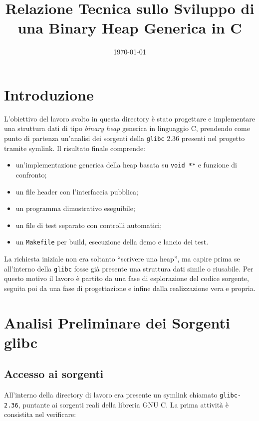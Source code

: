 \documentclass[a4paper,12pt]{article}
\title{Relazione Tecnica sullo Sviluppo di una Binary Heap Generica in C}
\author{}
\date{\today}
\begin{document}
\maketitle

\tableofcontents
\newpage

\section{Introduzione}

L'obiettivo del lavoro svolto in questa directory è stato progettare e implementare una struttura dati di tipo \emph{binary heap} generica in linguaggio C, prendendo come punto di partenza un'analisi dei sorgenti della \texttt{glibc} 2.36 presenti nel progetto tramite symlink. Il risultato finale comprende:

\begin{itemize}[leftmargin=*]
    \item un'implementazione generica della heap basata su \texttt{void **} e funzione di confronto;
    \item un file header con l'interfaccia pubblica;
    \item un programma dimostrativo eseguibile;
    \item un file di test separato con controlli automatici;
    \item un \texttt{Makefile} per build, esecuzione della demo e lancio dei test.
\end{itemize}

La richiesta iniziale non era soltanto ``scrivere una heap'', ma capire prima se all'interno della \texttt{glibc} fosse già presente una struttura dati simile o riusabile. Per questo motivo il lavoro è partito da una fase di esplorazione del codice sorgente, seguita poi da una fase di progettazione e infine dalla realizzazione vera e propria.

\section{Analisi Preliminare dei Sorgenti glibc}

\subsection{Accesso ai sorgenti}

All'interno della directory di lavoro era presente un symlink chiamato \texttt{glibc-2.36}, puntante ai sorgenti reali della libreria GNU C. La prima attività è consistita nel verificare:
\end{document}
